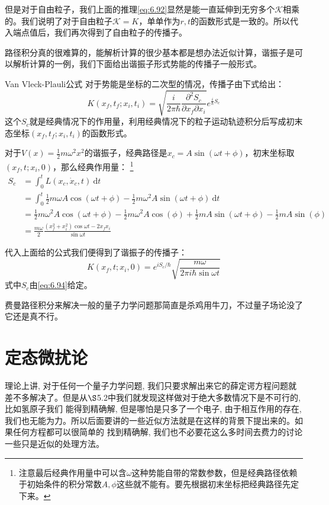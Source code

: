 \documentclass[a4paper,zihao=-4,linespread=1]{ctexrep}
\begin{document}
	但是对于自由粒子，我们上面的推理\ref{eq:6.92}显然是能一直延伸到无穷多个$\mathcal{K}$相乘的。我们说明了对于自由粒子$\mathcal{K}=K$，单单作为$r,t$的函数形式是一致的。所以代入端点值后，我们再次得到了自由粒子的传播子。
	
	路径积分真的很难算的，能解析计算的很少基本都是想办法近似计算，谐振子是可以解析计算的一例，我们下面给出谐振子形式势能的传播子一般形式。
	\begin{theorem}{Van Vleck-Plauli公式}
		对于势能是坐标的二次型的情况，传播子由下式给出：
		\begin{equation}
			K(x_f,t_f;x_i,t_i)=\sqrt{\frac{i}{2\pi\hbar}\frac{\partial^2S_c}{\partial x_f\partial x_i}}e^{\frac{i}{\hbar}S_c}
		\end{equation}
		这个$S_c$就是经典情况下的作用量，利用经典情况下的粒子运动轨迹积分后写成初末态坐标$(x_f,t_f;x_i,t_i)$的函数形式。
	\end{theorem}
	
	对于$V(x)=\frac{1}{2}m\omega^2x^2$的谐振子，经典路径是$x_c=A\sin(\omega t+\phi)$，初末坐标取$(x_f,t;x_i,0)$，那么经典作用量：	\footnote{注意最后经典作用量中可以含$\omega$这种势能自带的常数参数，但是经典路径依赖于初始条件的积分常数$A,\phi$这些就不能有。要先根据初末坐标把经典路径先定下来。}
	\begin{equation}
		\label{eq:6.94}
		\begin{aligned}
			S_c&=\int_{0}^t L(x_c,\dot{x}_c,t) \mathrm{~d}t\\
			&=\int_{0}^t \frac{1}{2}m\omega A\cos(\omega t+\phi)-\frac{1}{2}m\omega^2 A\sin(\omega t+\phi)\mathrm{~d}t\\
			&=\frac{1}{2}m\omega^2 A\cos(\omega t+\phi)-\frac{1}{2}m\omega^2 A\cos(\phi)+\frac{1}{2}m A\sin(\omega t+\phi)-\frac{1}{2}mA\sin(\phi)\\
			&=\frac{m\omega}{2} \frac{(x_f^2+x_i^2)\cos\omega t-2x_fx_i}{\sin\omega t}
		\end{aligned}
	\end{equation}
	
	代入上面给的公式我们便得到了谐振子的传播子：
	\begin{equation}
		K(x_f,t;x_i,0)=e^{iS_c/\hbar}\sqrt{\frac{m\omega}{2\pi i\hbar\sin\omega t}}
	\end{equation}
	式中$S_c$由\ref{eq:6.94}给定。
	
	费曼路径积分来解决一般的量子力学问题那简直是杀鸡用牛刀，不过量子场论没了它还是真不行。
	
	
    \chapter{定态微扰论}
    理论上讲, 对于任何一个量子力学问题, 我们只要求解出来它的薛定谔方程问题就差不多解决了。但是从$\S$5.2中我们就发现这样做对于绝大多数情况下是不可行的, 比如氢原子我们
    能得到精确解, 但是哪怕是只多了一个电子, 由于相互作用的存在, 我们也无能为力。所以后面要讲的一些近似方法就是在这样的背景下提出来的。如果任何方程都可以很简单的
    找到精确解, 我们也不必要花这么多时间去费力的讨论一些只是近似的处理方法。
    
\end{document}
